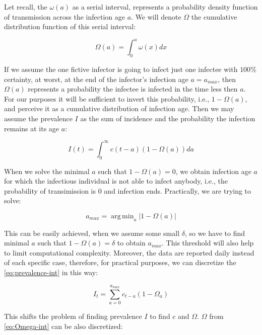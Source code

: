 \documentclass[
  digital, %
  oneside, %
  lof,     %
  lot,     %
]{fithesis4}
\DeclareMathOperator*{\argmin}{arg\,min}
\begin{document}
Let recall, the $\omega(a)$ as a serial interval, represents
a probability density function of transmission across
the infection age $a$.
We will denote $\Omega$ the cumulative distribution function
of this serial interval:

\begin{equation}\label{eq:Omega-int}
  \Omega(a) = \int_{0}^a \omega(x) dx
\end{equation}

If we assume the one fictive infector is going to infect
just one infectee with $100\%$ certainty, at worst, at the
end of the infector's infection age $a = a_{max}$, then
$\Omega(a)$ represents a probability the infectee is infected
in the time less then $a$.
For our purposes it will be sufficient to invert this probability,
i.e., $1 - \Omega(a)$, and perceive it as a cumulative distribution
of infection age. Then we may assume the prevalence $I$ as the sum
of incidence and the probability the infection remains at its
age $a$:

\begin{equation}\label{eq:prevalence-int}
  I(t) = \int_0^{\infty} c(t - a) (1 - \Omega(a)) da
\end{equation}

When we solve the minimal $a$ such
that $1 - \Omega(a) = 0$, we obtain infection age $a$ for which
the infectious individual is not able
to infect anybody, i.e., the probability of transimission
is $0$ and infection ends.
Practically, we are trying to solve:

\begin{equation}
  a_{max} = \argmin_a \left| 1 - \Omega(a) \right|
\end{equation}

This can be easily achieved, when we assume some small $\delta$,
so we have to find minimal $a$ such that $1 - \Omega(a) = \delta$
to obtain $a_{max}$. This threshold will also help to limit
computational complexity. Moreover, the data are reported daily
instead of each specific case, therefore, for practical purposes,
we can discretize the \eqref{eq:prevalence-int} in this way:

\begin{equation}\label{eq:prevalence-sum}
  I_t = \sum_{a=0}^{a_{max}} c_{t - a} (1 - \Omega_a)
\end{equation}

This shifts the problem of finding prevalence $I$ to find
$c$ and $\Omega$. $\Omega$ from \eqref{eq:Omega-int} can 
be also discretized:
\end{document}
